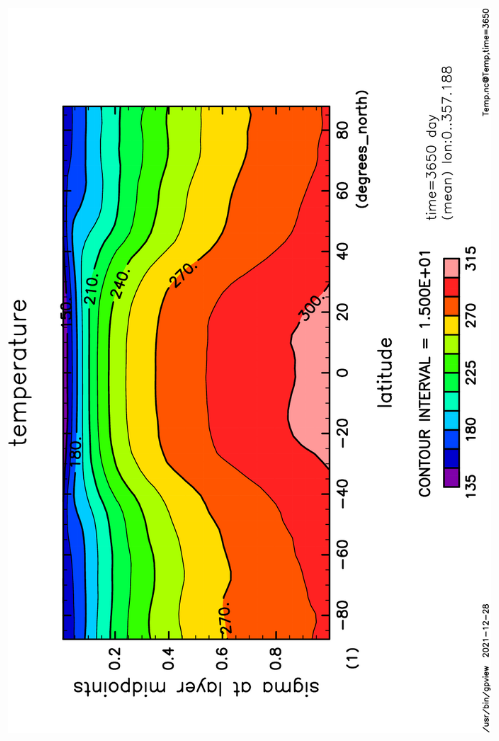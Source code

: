 \documentclass[aspectratio=149,9pt,fleqn]{beamer}
\begin{document}
\begin{frame}
\begin{columns}[T]
\begin{column}{.4\textwidth}
		\end{column}
		\begin{column}{.4\textwidth}
			\includegraphics[height=\textwidth,angle=-90]{S1600Temp,time=3650-crop.pdf}
		\end{column}
	\end{columns}
\end{frame}
\end{document}
